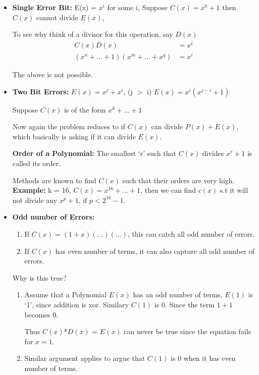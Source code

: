 \documentclass[12pt]{article}
\begin{document}
\begin{itemize}
    \item \textbf{Single Error Bit:} E(x) = \(x^i\) for some i,
    Suppose \(C(x) = x^k + 1\)
    then \(C(x)\) cannot divide \(E(x)\), 

    To see why think of a divisor for this operation, say \(D(x)\)
    \begin{align}
        C(x) D(x) &= x^i \\
        (x^n + \dots + 1)(x^m + \dots + x^q) &= x^i
    \end{align}

    The above is not possible.

    \item \textbf{Two Bit Errors:} 
    \(E(x) = x^j + x^i\), (j $>$ i)
    \(E(x) = x^i(x^{j-i} + 1)\)
    
    Suppose \(C(x)\) is of the form \(x^k + \dots + 1\)

    Now again the problem reduces to if \(C(x)\) can divide \(P(x) + E(x)\), which 
    basically is asking if it can divide \(E(x)\). 

    \textbf{Order of a Polynomial:} The smallest `r' such that \(C(x)\) divides \(x^r + 1\) is called its order. 
    
    Methods are known to find \(C(x)\) such that their orders are very high. 
    \textbf{Example:} k = 16, \(C(x) = x^{16} + \dots + 1\), then we can find \(c(x)\) s.t it will
    not divide any \(x^p + 1\), if \(p < 2^{16} - 1\). 

    \item \textbf{Odd number of Errors:}
    \begin{enumerate}
        \item If \(C(x) = (1+x)(...)(...)\), this can catch all odd number of errors.
        \item If \(C(x)\) has even number of terms, it can also capture all odd number of errors. 
    \end{enumerate}
    Why is this true?
    \begin{enumerate}
        \item Assume that a Polynomial \(E(x)\) has an odd number of terms, \(E(1)\) is `1', since addition is xor.
        Similary \(C(1)\) is 0. Since the term \(1 + 1\) becomes 0. 

        Thus \(C(x)\)*\(D(x)\) = \(E(x)\) can never be true since the equation fails for \(x = 1\).
        
        \item Similar argument applies to argue that \(C(1)\) is 0 when it has even number of terms.  
    \end{enumerate}


\end{itemize}
\end{document}
